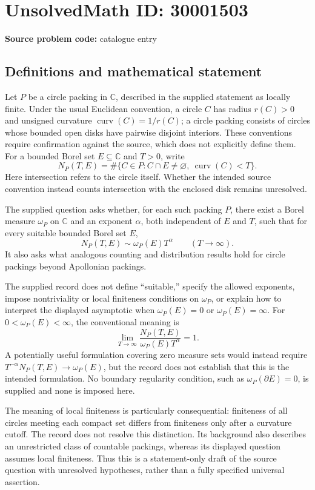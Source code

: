 \documentclass[11pt]{article}
\newcommand{\C}{\mathbb{C}}
\begin{document}
\section*{UnsolvedMath ID: 30001503}
\textbf{Source problem code:} catalogue entry
\subsection{Definitions and mathematical statement}
Let \(P\) be a circle packing in \(\C\), described in the supplied statement as locally finite. Under the usual Euclidean convention, a circle \(C\) has radius \(r(C)>0\) and unsigned curvature \(\operatorname{curv}(C)=1/r(C)\); a circle packing consists of circles whose bounded open disks have pairwise disjoint interiors. These conventions require confirmation against the source, which does not explicitly define them. For a bounded Borel set \(E\subseteq\C\) and \(T>0\), write
\[
N_P(T,E)=\#\{C\in P:C\cap E\ne\varnothing,\ \operatorname{curv}(C)<T\}.
\]
Here intersection refers to the circle itself. Whether the intended source convention instead counts intersection with the enclosed disk remains unresolved.

The supplied question asks whether, for each such packing \(P\), there exist a Borel measure \(\omega_P\) on \(\C\) and an exponent \(\alpha\), both independent of \(E\) and \(T\), such that for every suitable bounded Borel set \(E\),
\[
N_P(T,E)\sim\omega_P(E)T^\alpha\qquad(T\to\infty).
\]
It also asks what analogous counting and distribution results hold for circle packings beyond Apollonian packings.

The supplied record does not define ``suitable,'' specify the allowed exponents, impose nontriviality or local finiteness conditions on \(\omega_P\), or explain how to interpret the displayed asymptotic when \(\omega_P(E)=0\) or \(\omega_P(E)=\infty\). For \(0<\omega_P(E)<\infty\), the conventional meaning is
\[
\lim_{T\to\infty}\frac{N_P(T,E)}{\omega_P(E)T^\alpha}=1.
\]
A potentially useful formulation covering zero measure sets would instead require \(T^{-\alpha}N_P(T,E)\to\omega_P(E)\), but the record does not establish that this is the intended formulation. No boundary regularity condition, such as \(\omega_P(\partial E)=0\), is supplied and none is imposed here.

The meaning of local finiteness is particularly consequential: finiteness of all circles meeting each compact set differs from finiteness only after a curvature cutoff. The record does not resolve this distinction. Its background also describes an unrestricted class of countable packings, whereas its displayed question assumes local finiteness. Thus this is a statement-only draft of the source question with unresolved hypotheses, rather than a fully specified universal assertion.
\end{document}
